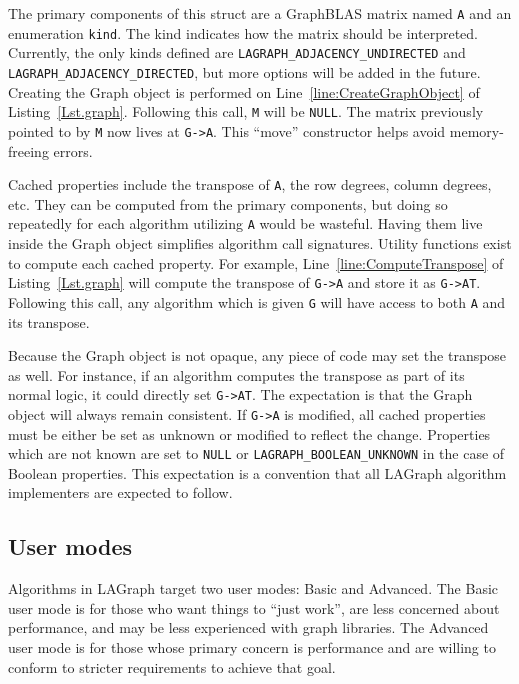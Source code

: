 The primary components of this struct are a GraphBLAS matrix named \verb'A' and an enumeration \verb'kind'.
The kind indicates how the matrix should be interpreted.
Currently, the only kinds defined are \verb'LAGRAPH_ADJACENCY_UNDIRECTED' and 
\verb'LAGRAPH_ADJACENCY_DIRECTED', but more options will be added in the future.  Creating the 
Graph object is performed on Line~\ref{line:CreateGraphObject} of Listing~\ref{Lst.graph}.
Following this call, \verb'M' will be \verb'NULL'. The matrix previously pointed to by \verb'M' now
lives at \verb'G->A'. This ``move'' constructor helps avoid memory-freeing errors.

Cached properties include the transpose of \verb'A', the row degrees, column degrees, etc.
They can be computed from the primary components, but doing so repeatedly for each algorithm
utilizing \verb'A' would be wasteful. Having them live inside the Graph object simplifies
algorithm call signatures. Utility functions exist to compute each cached property.  For example,
Line~\ref{line:ComputeTranspose} of Listing~\ref{Lst.graph} will compute the transpose of \verb'G->A' and store it as \verb'G->AT'.
Following this call, any algorithm which is given \verb'G' will have access to both \verb'A' and its transpose.

Because the Graph object is not opaque, any piece of code may set the transpose as well. For instance, if an algorithm
computes the transpose as part of its normal logic, it could directly set \verb'G->AT'.
The expectation is that the Graph object will always remain consistent.
If \verb'G->A' is modified, all cached properties must be either be set as unknown or modified to reflect the change.
Properties which are not known are set to \verb'NULL' or \verb'LAGRAPH_BOOLEAN_UNKNOWN' in the case of Boolean properties.
This expectation is a convention that all LAGraph algorithm implementers are expected to follow.



\subsection{User modes}

Algorithms in LAGraph target two user modes: Basic and Advanced. The Basic user mode is for those who want
things to ``just work'', are less concerned about performance, and may be less experienced with graph libraries.
The Advanced user mode is for those whose primary concern is performance and are willing to conform to stricter
requirements to achieve that goal.

